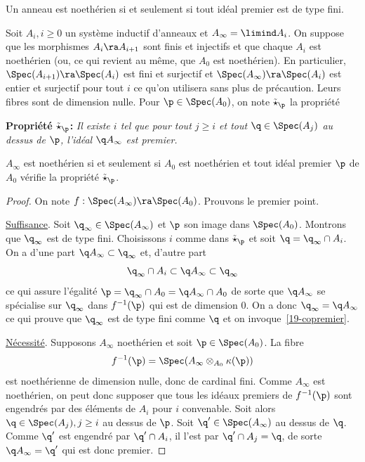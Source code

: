 \documentclass[10pt]{../fichiers-configuration-latex/smfart}
\begin{document}
\begin{proposition}[Cohen]\label{19-copremier} Un anneau est noethérien si et seulement si tout
idéal premier est de type fini.\end{proposition}


Soit $A_i,i\geq 0$ un système inductif d'anneaux et $A_\infty=\limind A_i$. On suppose que les
morphismes $A_i\ra A_{i+1}$ sont finis et injectifs et que chaque $A_i$ est noethérien (ou, ce qui
revient au même, que $A_0$ est noethérien). En particulier, $\Spec(A_{i+1})\ra\Spec(A_i)$ est fini
et surjectif et  $\Spec(A_\infty)\ra\Spec(A_i)$ est entier et surjectif pour tout $i$ ce qu'on
utilisera sans plus de précaution. Leurs  fibres sont de dimension nulle.  Pour $\p\in\Spec(A_0)$,
on note $\tilde\star_\p$ la propriété

\textbf{Propriété $\tilde\star_\p$:}\emph{ Il existe $i$ tel que pour tout $j\geq i$ et tout
$\q\in\Spec(A_j)$ au dessus de $\p$, l'idéal $\q A_\infty$ est premier.}

\begin{proposition}\label{19-crit-noeth0} $A_\infty$ est noethérien si et seulement si  $A_0$ est
noethérien et tout idéal premier $\p$ de $A_0$ vérifie la
propriété $\tilde\star_\p$.
\end{proposition}

\begin{proof}On note $f:\Spec(A_\infty)\ra\Spec(A_0)$. Prouvons le premier point.

\underline{Suffisance}. Soit $\q_\infty\in\Spec(A_\infty)$ et $\p$ son image dans $\Spec(A_0)$.
Montrons que $\q_\infty$ est de type fini. Choisissons $i$ comme dans $\tilde\star_\p$ et soit
$\q=\q_\infty\cap A_i$. On a d'une part $\q A_\infty\subset\q_\infty$ et, d'autre part
$$\q_\infty\cap A_i\subset\q A_\infty\subset\q_\infty$$ ce qui assure l'égalité $\p=\q_\infty\cap
A_0=\q A_\infty\cap A_0$ de sorte que $\q A_\infty$ se spécialise sur  $\q_\infty$ dans $f^{-1}(\p)$
qui est de dimension $0$. On a donc $\q_\infty=\q A_\infty$ ce qui prouve que $\q_\infty$ est de
type fini comme $\q$ et on invoque~\ref{19-copremier}.

\underline{Nécessité}. Supposons $A_\infty$ noethérien et soit $\p\in\Spec(A_0)$. La fibre
$$f^{-1}(\p)=\Spec(A_\infty\otimes_{A_0}\kappa(\p))$$ est noethérienne de dimension nulle, donc de
cardinal fini. Comme $A_\infty$ est noethérien, on peut donc supposer que tous les idéaux premiers
de $f^{-1}(\p)$ sont engendrés par des éléments de $A_i$ pour $i$ convenable. Soit alors
$\q\in\Spec(A_j), j\geq i$ au dessus de $\p$.  Soit $\q'\in\Spec(A_\infty)$ au dessus de $\q$. Comme
$\q'$ est engendré par $\q'\cap A_i$, il l'est par $\q'\cap A_j=\q$, de sorte $\q A_\infty=\q'$ qui
est donc premier.\end{proof}
\end{document}
